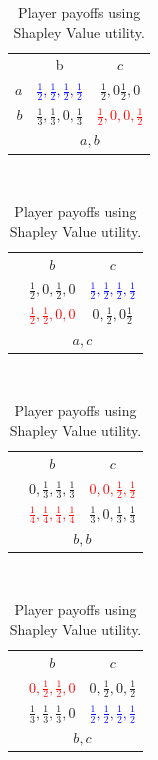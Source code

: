 \documentclass[11pt, onecolumn, compsoc, letterpaper]{article}
\begin{document}
\begin{table}[!htb]
	\centering\begin{tabular}{r|c|c|}
	\multicolumn{1}{c}{}
	& \multicolumn{1}{c}{b}
	& \multicolumn{1}{c}{$c$}\\
	\cline{2-3}
	$a$ & \textcolor{blue}{$\frac{1}{2},\frac{1}{2},\frac{1}{2},\frac{1}{2}$} & $\frac{1}{2},0\frac{1}{2},0$\\
	\cline{2-3}
	$b$ & $\frac{1}{3},\frac{1}{3},0,\frac{1}{3}$ & \textcolor{red}{$\frac{1}{2},0,0,\frac{1}{2}$}\\
	\cline{2-3}
	\multicolumn{1}{c}{}
	& \multicolumn{2}{c}{$a,b$}
	\end{tabular}~
	\centering\begin{tabular}{r|c|c|}
	\multicolumn{1}{c}{}
	& \multicolumn{1}{c}{$b$}
	& \multicolumn{1}{c}{$c$}\\
	\cline{2-3}
	& $\frac{1}{2},0,\frac{1}{2},0$ & \textcolor{blue}{$\frac{1}{2},\frac{1}{2},\frac{1}{2},\frac{1}{2}$} \\
	\cline{2-3}
	& \textcolor{red}{$\frac{1}{2},\frac{1}{2},0,0$} & $0,\frac{1}{2},0\frac{1}{2}$ \\
	\cline{2-3}
	\multicolumn{1}{c}{}
	& \multicolumn{2}{c}{$a,c$}
	\end{tabular}~
	\centering\begin{tabular}{r|c|c|}
	\multicolumn{1}{c}{}
	& \multicolumn{1}{c}{$b$}
	& \multicolumn{1}{c}{$c$}\\
	\cline{2-3}
	& $0,\frac{1}{3},\frac{1}{3},\frac{1}{3}$ & \textcolor{red}{$0,0,\frac{1}{2},\frac{1}{2}$}\\
	\cline{2-3}
	& \textcolor{red}{$\frac{1}{4},\frac{1}{4},\frac{1}{4},\frac{1}{4}$} & $\frac{1}{3},0,\frac{1}{3},\frac{1}{3}$\\
	\cline{2-3}
	\multicolumn{1}{c}{}
	& \multicolumn{2}{c}{$b,b$}
	\end{tabular}~
	\centering\begin{tabular}{r|c|c|}
	\multicolumn{1}{c}{}
	& \multicolumn{1}{c}{$b$}
	& \multicolumn{1}{c}{$c$}\\
	\cline{2-3}
	& \textcolor{red}{$0,\frac{1}{2},\frac{1}{2},0$} & $0,\frac{1}{2},0,\frac{1}{2}$\\
	\cline{2-3}
	& $\frac{1}{3},\frac{1}{3},\frac{1}{3},0$ & \textcolor{blue}{$\frac{1}{2},\frac{1}{2},\frac{1}{2},\frac{1}{2}$}\\
	\cline{2-3}
	\multicolumn{1}{c}{}
	& \multicolumn{2}{c}{$b,c$}
	\end{tabular}
	\centering\caption{Player payoffs using Shapley Value utility.}\label{tab:svUtil}
\end{table}
\end{document}
